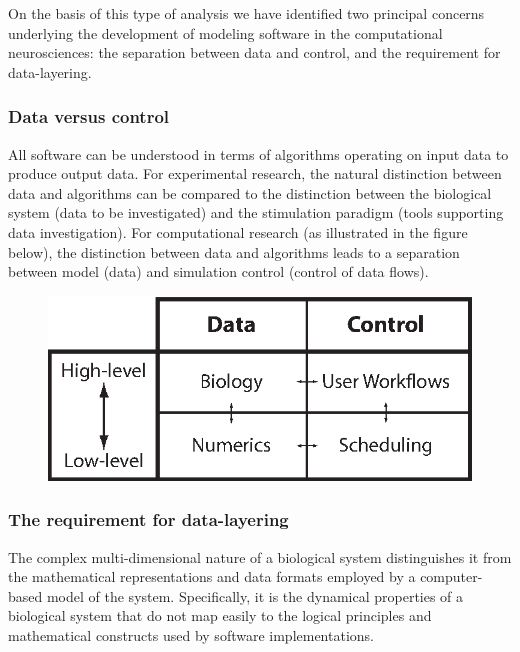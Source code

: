\documentclass[12pt]{article}
\begin{document}
On the basis of this type of analysis we have identified two principal concerns underlying the development of modeling software in the computational neurosciences: the separation between data and control, and the requirement for data-layering.

\subsubsection*{Data versus control}
\label{sec:data-vs-control}
All software can be understood in terms of algorithms operating on input data to produce output data. For experimental research, the natural distinction between data and algorithms can be compared to the distinction between the biological system (data to be investigated) and the stimulation paradigm (tools supporting data investigation). For computational research (as illustrated in the figure below), the distinction between data and algorithms leads to a separation between model (data) and simulation control (control of data flows). 

\begin{figure}[h]
  \centering
 \includegraphics[scale=0.95]{figures/G3-Data-Control.eps}
  \label{fig:datacontrol}
\end{figure}

\subsubsection*{The requirement for data-layering}
\label{sec:data-layering}
The complex multi-dimensional nature of a biological system distinguishes it from the mathematical representations and data formats employed by a computer-based model of the system. Specifically, it is the dynamical properties of a biological system that do not map easily to the logical principles and mathematical constructs used by software implementations.
\end{document}
